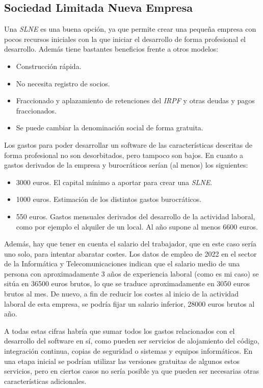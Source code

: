 \subsection{Sociedad Limitada Nueva Empresa}

Una \textit{SLNE} es una buena opción, ya que permite crear una pequeña empresa con pocos recursos iniciales con la que iniciar el desarrollo de forma profesional el desarrollo. Además tiene bastantes beneficios frente a otros modelos:

\begin{itemize}
	\item Construcción rápida.
	\item No necesita registro de socios.
	\item Fraccionado y aplazamiento de retenciones del \textit{IRPF} y otras deudas y pagos fraccionados.
	\item Se puede cambiar la denominación social de forma gratuita.
\end{itemize}

Los gastos para poder desarrollar un software de las características descritas de forma profesional no son desorbitados, pero tampoco son bajos. En cuanto a gastos derivados de la empresa y burocráticos serían (al menos) los siguientes:

\begin{itemize}
	\item 3000 euros. El capital mínimo a aportar para crear una \textit{SLNE}.
	\item 1000 euros. Estimación de los distintos gastos burocráticos.
	\item 550 euros. Gastos mensuales derivados del desarrollo de la actividad laboral, como por ejemplo el alquiler de un local. Al año supone al menos 6600 euros.
\end{itemize}

Además, hay que tener en cuenta el salario del trabajador, que en este caso sería uno solo, para intentar abaratar costes. Los datos de empleo de 2022 en el sector de la Informática y Telecomunicaciones\cite{jobted} indican que el salario medio de una persona con aproximadamente 3 años de experiencia laboral (como es mi caso) se sitúa en 36500 euros brutos, lo que se traduce aproximadamente en 3050 euros brutos al mes. De nuevo, a fin de reducir los costes al inicio de la actividad laboral de esta empresa, se podría fijar un salario inferior, 28000 euros brutos al año.

A todas estas cifras habría que sumar todos los gastos relacionados con el desarrollo del software en sí, como pueden ser servicios de alojamiento del código, integración continua, copias de seguridad o sistemas y equipos informáticos. En una etapa inicial se podrían utilizar las versiones gratuitas de algunos estos servicios, pero en ciertos casos no sería posible ya que pueden ser necesarias otras características adicionales.

